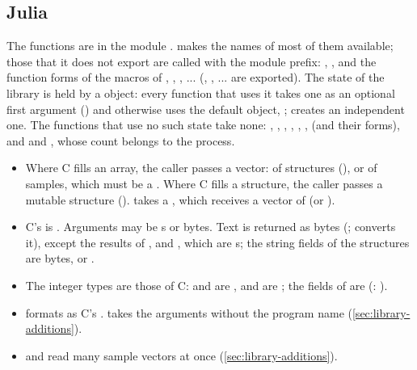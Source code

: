\subsection{Julia}
\label{sec:library-julia}

The functions are in the module .  makes the
names of most of them available; those that it does not export are called
with the module prefix: , ,
and the function forms of the macros of ,
, , ... (,
, ... are exported). The state of the library is held by a
 object: every function that uses it takes one as an optional
first argument () and otherwise uses the
default object, ;  creates an independent one. The
functions that use no such state take none: ,
, , , ,
,  (and their  forms), and
 and , whose
count belongs to the process.

\begin{itemize}
\item Where C fills an array, the caller passes a vector: of 
  structures (), or of samples, which must
  be a . Where C fills a structure, the caller passes
  a mutable structure ().  takes a
  , which receives a vector of  (or ).
\item C's  is . Arguments may be s or
  bytes. Text is returned as bytes (; 
  converts it), except the results of ,  and
  , which are s; the string fields of the
  structures are bytes, or .
\item The integer types are those of C:  and  are
  ,  and  are ; the
   fields of  are  (:
  ).
\item {} formats as C's .
   takes the arguments without the program
  name (\cref{sec:library-additions}).
\item {} and  read many sample vectors at
  once (\cref{sec:library-additions}).
\end{itemize}

